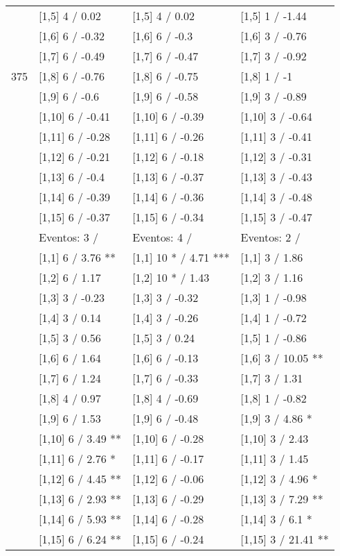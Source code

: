 \begin{table}
\begin{tabular}[t]{llll}
 & {}[1,5] 4  / 0.02 & {}[1,5] 4  / 0.02 & {}[1,5] 1  / -1.44\\
 & {}[1,6] 6  / -0.32 & {}[1,6] 6  / -0.3 & {}[1,6] 3  / -0.76\\
 & {}[1,7] 6  / -0.49 & {}[1,7] 6  / -0.47 & {}[1,7] 3  / -0.92\\
375 & {}[1,8] 6  / -0.76 & {}[1,8] 6  / -0.75 & {}[1,8] 1  / -1\\
\addlinespace
 & {}[1,9] 6  / -0.6 & {}[1,9] 6  / -0.58 & {}[1,9] 3  / -0.89\\
 & {}[1,10] 6  / -0.41 & {}[1,10] 6  / -0.39 & {}[1,10] 3  / -0.64\\
 & {}[1,11] 6  / -0.28 & {}[1,11] 6  / -0.26 & {}[1,11] 3  / -0.41\\
 & {}[1,12] 6  / -0.21 & {}[1,12] 6  / -0.18 & {}[1,12] 3  / -0.31\\
 & {}[1,13] 6  / -0.4 & {}[1,13] 6  / -0.37 & {}[1,13] 3  / -0.43\\
\addlinespace
 & {}[1,14] 6  / -0.39 & {}[1,14] 6  / -0.36 & {}[1,14] 3  / -0.48\\
 & {}[1,15] 6  / -0.37 & {}[1,15] 6  / -0.34 & {}[1,15] 3  / -0.47\\
 & Eventos:  3 / & Eventos:  4 / & Eventos:  2 /\\
 & {}[1,1] 6  / 3.76 ** & {}[1,1] 10 * / 4.71 *** & {}[1,1] 3  / 1.86\\
 & {}[1,2] 6  / 1.17 & {}[1,2] 10 * / 1.43 & {}[1,2] 3  / 1.16\\
\addlinespace
 & {}[1,3] 3  / -0.23 & {}[1,3] 3  / -0.32 & {}[1,3] 1  / -0.98\\
 & {}[1,4] 3  / 0.14 & {}[1,4] 3  / -0.26 & {}[1,4] 1  / -0.72\\
 & {}[1,5] 3  / 0.56 & {}[1,5] 3  / 0.24 & {}[1,5] 1  / -0.86\\
 & {}[1,6] 6  / 1.64 & {}[1,6] 6  / -0.13 & {}[1,6] 3  / 10.05 **\\
 & {}[1,7] 6  / 1.24 & {}[1,7] 6  / -0.33 & {}[1,7] 3  / 1.31\\
\addlinespace
500 & {}[1,8] 4  / 0.97 & {}[1,8] 4  / -0.69 & {}[1,8] 1  / -0.82\\
 & {}[1,9] 6  / 1.53 & {}[1,9] 6  / -0.48 & {}[1,9] 3  / 4.86 *\\
 & {}[1,10] 6  / 3.49 ** & {}[1,10] 6  / -0.28 & {}[1,10] 3  / 2.43\\
 & {}[1,11] 6  / 2.76 * & {}[1,11] 6  / -0.17 & {}[1,11] 3  / 1.45\\
 & {}[1,12] 6  / 4.45 ** & {}[1,12] 6  / -0.06 & {}[1,12] 3  / 4.96 *\\
\addlinespace
 & {}[1,13] 6  / 2.93 ** & {}[1,13] 6  / -0.29 & {}[1,13] 3  / 7.29 **\\
 & {}[1,14] 6  / 5.93 ** & {}[1,14] 6  / -0.28 & {}[1,14] 3  / 6.1 *\\
 & {}[1,15] 6  / 6.24 ** & {}[1,15] 6  / -0.24 & {}[1,15] 3  / 21.41 **\\
\bottomrule
\end{tabular}
\end{table}
